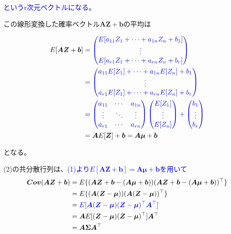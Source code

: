 \documentclass{article}
\begin{document}
\textcolor{blue}{というr次元ベクトルになる。}

\smallskip



\smallskip

この線形変換した確率ベクトル$\bm{A}\bm{Z} + \bm{b}$の平均は



\begin{align*}
  E[\bm{A}\bm{Z} + \bm{b}] 
  &= 
  \textcolor{blue}{\begin{pmatrix}
    E[a_{11} Z_1 + \dots + a_{1n}Z_n+b_1] \\
    \vdots \\
    E[a_{r1} Z_1 + \dots + a_{rn}Z_n+b_r] \\
  \end{pmatrix}} \\
  &=
  \textcolor{blue}{\begin{pmatrix}
    a_{11}E[Z_1] + \dots + a_{1n}E[Z_n]+b_1 \\
    \vdots \\
    a_{r1}E[Z_1] + \dots + a_{rn}E[Z_n]+b_r\\
  \end{pmatrix}} \\
  &=
  \textcolor{blue}{\begin{pmatrix}
    a_{11} & \cdots & a_{1n} \\
    \vdots & \ddots & \vdots \\
    a_{r1} & \cdots & a_{rn}
    \end{pmatrix}
    \begin{pmatrix}
      E[Z_1] \\
      \vdots \\
      E[Z_n]
    \end{pmatrix}
  +
  \begin{pmatrix}
    b_1 \\
    \vdots \\
    b_r
  \end{pmatrix}}
  \\
  &= \bm{A}E[\bm{Z}] + \bm{b} = \bm{A}\bm{\mu} + \bm{b}
\end{align*}

となる。

\newpage

(2)の共分散行列は、\textcolor{blue}{(1)より$E[\bm{A}\bm{Z} + \bm{b}] = \bm{A}\bm{\mu} + \bm{b}$を用いて}
\begin{align*}
  \bm{Cov}(\bm{A}\bm{Z} + \bm{b}) 
  &= E\{ (\bm{A}\bm{Z} + \bm{b} - (\bm{A}\bm{\mu} + \bm{b})) (\bm{A}\bm{Z} + \bm{b} - (\bm{A}\bm{\mu} + \bm{b}))^\top \} \\
  &= E\{ (\bm{A}(\bm{Z} - \bm{\mu})) (\bm{A}(\bm{Z} - \bm{\mu}))^\top \} \\
  &= \textcolor{blue}{E[ \bm{A}(\bm{Z} - \bm{\mu})(\bm{Z} - \bm{\mu})^\top \bm{A}^\top ]} \\
  &= \bm{A}E[(\bm{Z} - \bm{\mu})(\bm{Z} - \bm{\mu})^\top] \bm{A}^\top \\
  &= \bm{A}\bm{\Sigma}\bm{A}^\top
\end{align*}
\end{document}
